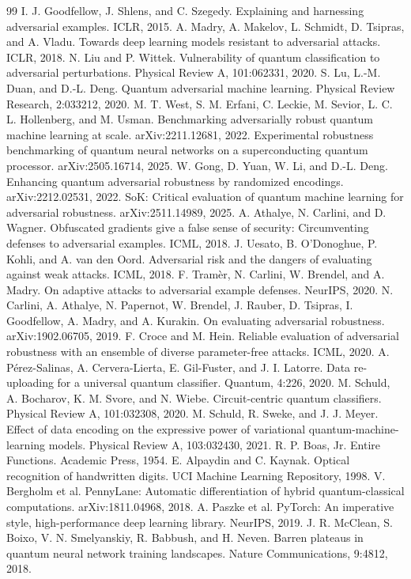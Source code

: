 \documentclass[11pt]{article}
\begin{document}
\begin{thebibliography}{99}
 I. J. Goodfellow, J. Shlens, and C. Szegedy. Explaining and harnessing adversarial examples. ICLR, 2015.
 A. Madry, A. Makelov, L. Schmidt, D. Tsipras, and A. Vladu. Towards deep learning models resistant to adversarial attacks. ICLR, 2018.
 N. Liu and P. Wittek. Vulnerability of quantum classification to adversarial perturbations. Physical Review A, 101:062331, 2020.
 S. Lu, L.-M. Duan, and D.-L. Deng. Quantum adversarial machine learning. Physical Review Research, 2:033212, 2020.
 M. T. West, S. M. Erfani, C. Leckie, M. Sevior, L. C. L. Hollenberg, and M. Usman. Benchmarking adversarially robust quantum machine learning at scale. arXiv:2211.12681, 2022.
 Experimental robustness benchmarking of quantum neural networks on a superconducting quantum processor. arXiv:2505.16714, 2025.
 W. Gong, D. Yuan, W. Li, and D.-L. Deng. Enhancing quantum adversarial robustness by randomized encodings. arXiv:2212.02531, 2022.
 SoK: Critical evaluation of quantum machine learning for adversarial robustness. arXiv:2511.14989, 2025.
 A. Athalye, N. Carlini, and D. Wagner. Obfuscated gradients give a false sense of security: Circumventing defenses to adversarial examples. ICML, 2018.
 J. Uesato, B. O'Donoghue, P. Kohli, and A. van den Oord. Adversarial risk and the dangers of evaluating against weak attacks. ICML, 2018.
 F. Tramèr, N. Carlini, W. Brendel, and A. Madry. On adaptive attacks to adversarial example defenses. NeurIPS, 2020.
 N. Carlini, A. Athalye, N. Papernot, W. Brendel, J. Rauber, D. Tsipras, I. Goodfellow, A. Madry, and A. Kurakin. On evaluating adversarial robustness. arXiv:1902.06705, 2019.
 F. Croce and M. Hein. Reliable evaluation of adversarial robustness with an ensemble of diverse parameter-free attacks. ICML, 2020.
 A. Pérez-Salinas, A. Cervera-Lierta, E. Gil-Fuster, and J. I. Latorre. Data re-uploading for a universal quantum classifier. Quantum, 4:226, 2020.
 M. Schuld, A. Bocharov, K. M. Svore, and N. Wiebe. Circuit-centric quantum classifiers. Physical Review A, 101:032308, 2020.
 M. Schuld, R. Sweke, and J. J. Meyer. Effect of data encoding on the expressive power of variational quantum-machine-learning models. Physical Review A, 103:032430, 2021.
 R. P. Boas, Jr. Entire Functions. Academic Press, 1954.
 E. Alpaydin and C. Kaynak. Optical recognition of handwritten digits. UCI Machine Learning Repository, 1998.
 V. Bergholm et al. PennyLane: Automatic differentiation of hybrid quantum-classical computations. arXiv:1811.04968, 2018.
 A. Paszke et al. PyTorch: An imperative style, high-performance deep learning library. NeurIPS, 2019.
 J. R. McClean, S. Boixo, V. N. Smelyanskiy, R. Babbush, and H. Neven. Barren plateaus in quantum neural network training landscapes. Nature Communications, 9:4812, 2018.
\end{thebibliography}
\end{document}
